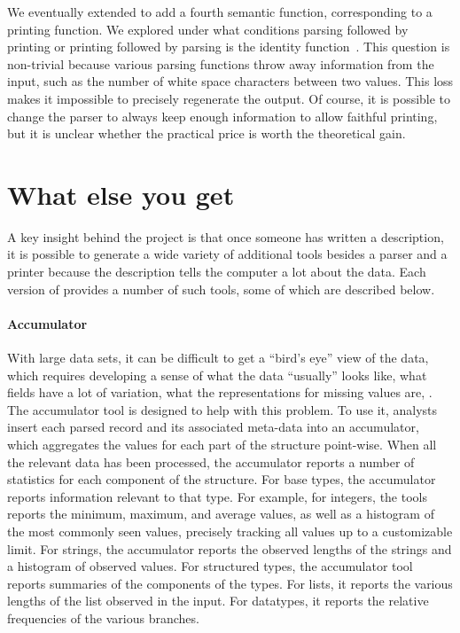 \documentclass{sig-alternate}
\begin{document}
We eventually extended \ddca{} to add a fourth semantic function,
corresponding to a printing function.  We explored under what
conditions parsing followed by printing or printing followed by
parsing is the identity function~\cite{fisher+:ddc-printing}.  This
question is non-trivial because various parsing functions throw away
information from the input, such as the number of white space
characters between two values.  This loss makes it impossible to
precisely regenerate the output.  Of course, it is possible to change
the parser to always keep enough information to allow faithful
printing, but it is unclear whether the practical price is worth the theoretical
gain.



\section{What else you get}
\label{sec:tools}
A key insight behind the \pads{} project is that once someone has
written a description, it is possible to generate a wide variety of
additional tools besides a parser and a printer because the description
tells the computer a lot about the data.  Each version of \pads{}
provides a number of such tools, some of which are described below.


\paragraph{Accumulator} With large data sets, it can be difficult to get a
  ``bird's eye'' view of the data, which requires developing a sense
  of what the data ``usually'' looks like, what fields have a lot of
  variation, what the representations for missing values are, \etc.
  The accumulator tool is designed to help with this problem.  To use
  it, analysts insert each parsed record and its associated meta-data
  into an accumulator, which aggregates the values for each part of
  the structure point-wise.  When all the relevant data has been
  processed, the accumulator reports a number of statistics for each
  component of the structure.  For base types, the accumulator reports
  information relevant to that type.  For example, for integers, the
  tools reports the minimum, maximum, and average values, as well as a
  histogram of the most commonly seen values, precisely tracking all
  values up to a customizable limit.  For strings, the accumulator
  reports the observed lengths of the strings and a histogram of
  observed values.  For structured types, the accumulator tool reports
  summaries of the components of the types.  For lists, it reports the
  various lengths of the list observed in the input.  For datatypes,
  it reports the relative frequencies of the various branches.  
\end{document}
